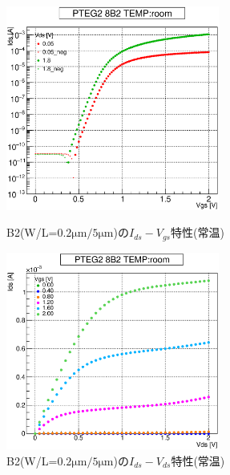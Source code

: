 				\begin{figure}[htbp]
					\begin{minipage}{0.5\hsize}
						\begin{center}
							\includegraphics[width=70mm]{./Chapter/Appendix/Picture/NBT/B2/PTEG2_8_B2_IdVg_room.eps}
						\end{center}
						\caption{B2(W/L=$0.2\mathrm{\mu m}/5\mathrm{\mu m}$)の$I_{ds}-V_{gs}$特性(常温)}
						\label{fig:B2_IdVg_room}
					\end{minipage}
					\begin{minipage}{0.5\hsize}
						\begin{center}
							\includegraphics[width=70mm]{./Chapter/Appendix/Picture/NBT/B2/PTEG2_8_B2_IdVd_room.eps}
						\end{center}
						\caption{B2(W/L=$0.2\mathrm{\mu m}/5\mathrm{\mu m}$)の$I_{ds}-V_{ds}$特性(常温)}
						\label{fig:B2_IdVd_room}
					\end{minipage}
				\end{figure}
